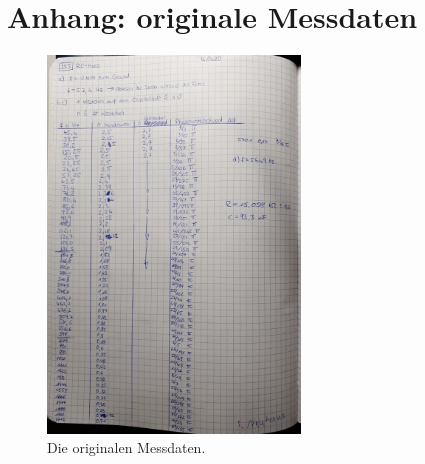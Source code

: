 \FloatBarrier
\newpage
\section*{Anhang: originale Messdaten}
\label{sec:Anhang}
\begin{figure}
    \centering
    \includegraphics[width=0.6\textwidth]{plots/Anhang.jpeg}
    \caption{Die originalen Messdaten.}
\end{figure}